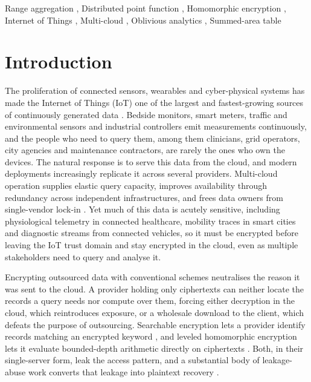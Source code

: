 \documentclass[a4paper,fleqn]{cas-sc}
\begin{document}
\begin{keywords}
Range aggregation \sep
Distributed point function \sep
Homomorphic encryption \sep
Internet of Things \sep
Multi-cloud \sep
Oblivious analytics \sep
Summed-area table
\end{keywords}

\maketitle

\section{Introduction}
\label{sec:intro}

The proliferation of connected sensors, wearables and cyber-physical systems
has made the Internet of Things (IoT) one of the largest and fastest-growing
sources of continuously generated data \citep{atzori2010internet}. Bedside
monitors, smart meters, traffic and environmental sensors and industrial
controllers emit measurements continuously, and the people who need to query
them, among them clinicians, grid operators, city agencies and maintenance
contractors, are rarely the ones who own the devices. The natural response is
to serve this data from the cloud, and modern deployments increasingly
replicate it across several providers. Multi-cloud operation supplies elastic
query capacity, improves availability through redundancy across independent
infrastructures, and frees data owners from single-vendor lock-in
\citep{petcu2013multicloud,grozev2014intercloud}. Yet much of this data is
acutely sensitive, including physiological telemetry in connected healthcare,
mobility traces in smart cities and diagnostic streams from connected
vehicles, so it must be encrypted before leaving the IoT trust domain and stay
encrypted in the cloud, even as multiple stakeholders need to query and
analyse it.

Encrypting outsourced data with conventional schemes neutralises the reason it
was sent to the cloud. A provider holding only ciphertexts can neither locate
the records a query needs nor compute over them, forcing either decryption in
the cloud, which reintroduces exposure, or a wholesale download to the client,
which defeats the purpose of outsourcing. Searchable encryption lets a
provider identify records matching an encrypted keyword
\citep{song2000practical,curtmola2006searchable,islam2023keyword}, and leveled
homomorphic encryption lets it evaluate bounded-depth arithmetic directly on
ciphertexts \citep{fan2012somewhat,cryptoeprint:2016/421}. Both, in their
single-server form, leak the access pattern, and a substantial body of
leakage-abuse work converts that leakage into plaintext recovery
\citep{islam2012access,cash2015leakage,grubbs2017leakage}.
\end{document}

